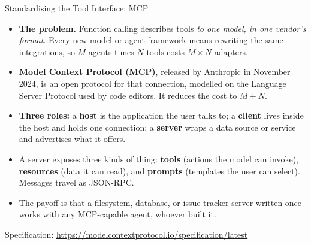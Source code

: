 \begin{frame}{Standardising the Tool Interface: MCP}
  \begin{itemize}
    \item[\textcolor{red}{$\triangleright$}] \textbf{The problem.} Function calling describes tools
      \emph{to one model, in one vendor's format}. Every new model or agent framework means rewriting
      the same integrations, so $M$ agents times $N$ tools costs $M \times N$ adapters.
    \item[\textcolor{red}{$\triangleright$}] \textbf{Model Context Protocol (MCP)}, released by
      Anthropic in November 2024, is an open protocol for that connection, modelled on the Language
      Server Protocol used by code editors. It reduces the cost to $M + N$.
    \item[\textcolor{red}{$\triangleright$}] \textbf{Three roles:} a \textbf{host} is the application
      the user talks to; a \textbf{client} lives inside the host and holds one connection; a
      \textbf{server} wraps a data source or service and advertises what it offers.
    \item[\textcolor{red}{$\triangleright$}] A server exposes three kinds of thing: \textbf{tools}
      (actions the model can invoke), \textbf{resources} (data it can read), and \textbf{prompts}
      (templates the user can select). Messages travel as JSON-RPC.
    \item[\textcolor{red}{$\triangleright$}] The payoff is that a filesystem, database, or issue-tracker
      server written once works with any MCP-capable agent, whoever built it.
  \end{itemize}
  \vspace{0.3em}
  {\scriptsize Specification: \url{https://modelcontextprotocol.io/specification/latest}}
\end{frame}

